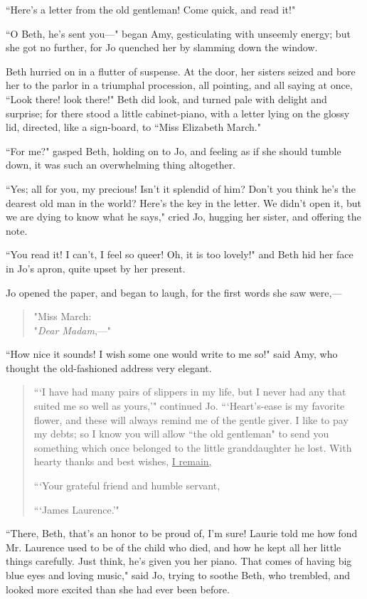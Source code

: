 ``Here's a letter from the old gentleman! Come quick, and
read it!"

``O Beth, he's sent you---" began Amy, gesticulating with
unseemly energy; but she got no further, for Jo quenched her by slamming
down the window.

Beth hurried on in a flutter of suspense. At the door, her sisters
seized and bore her to the parlor in a triumphal procession, all
pointing, and all saying at once, ``Look there! look there!" Beth did
look, and turned pale with delight and surprise; for there stood a
little cabinet-piano, with a letter lying on the glossy lid, directed,
like a sign-board, to ``Miss Elizabeth March."

``For me?" gasped Beth, holding on to Jo, and feeling as if she should
tumble down, it was such an overwhelming thing altogether.

``Yes; all for you, my precious! Isn't it splendid of
him? Don't you think he's the dearest
old man in the world? Here's the key in the letter. We
didn't open it, but we are dying to know what he says,"
cried Jo, hugging her sister, and offering the note.

``You read it! I can't, I feel so queer! Oh, it is too
lovely!" and Beth hid her face in Jo's apron, quite
upset by her present.

Jo opened the paper, and began to laugh, for the first words she saw
were,---

\begin{quote}
"{Miss March}:\\
{"\emph{Dear Madam},---"}
\end{quote}

``How nice it sounds! I wish some one would write to me so!" said Amy,
who thought the old-fashioned address very elegant.

\begin{quote}
```I have had many pairs of slippers in my life, but I
never had any that suited me so well as yours,'"
continued Jo. ```Heart's-ease is my
favorite flower, and these will always remind me of the gentle giver. I
like to pay my debts; so I know you will allow ``the old gentleman" to
send you something which once belonged to the little granddaughter he
lost. With hearty thanks and best wishes, \underline{I remain,}

```Your grateful friend and humble servant,

```James Laurence.'"
\end{quote}

``There, Beth, that's an honor to be proud of,
I'm sure! Laurie told me how fond Mr. Laurence used to
be of the child who died, and how he kept all her little things
carefully. Just think, he's given you her piano. That
comes of having big blue eyes and loving music," said Jo, trying to
soothe Beth, who trembled, and looked more excited than she had ever
been before.


